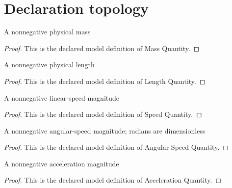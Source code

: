 \section{Declaration topology}
\begin{definition}
  \label{def:physics:phyx-mini-0770:phyxminiproblems-problemphyxmini0770-massquantity}
  A nonnegative physical mass
\end{definition}
\begin{proof}
  This is the declared model definition of Mass Quantity.
\end{proof}
\begin{definition}
  \label{def:physics:phyx-mini-0770:phyxminiproblems-problemphyxmini0770-lengthquantity}
  A nonnegative physical length
\end{definition}
\begin{proof}
  This is the declared model definition of Length Quantity.
\end{proof}
\begin{definition}
  \label{def:physics:phyx-mini-0770:phyxminiproblems-problemphyxmini0770-speedquantity}
  A nonnegative linear-speed magnitude
\end{definition}
\begin{proof}
  This is the declared model definition of Speed Quantity.
\end{proof}
\begin{definition}
  \label{def:physics:phyx-mini-0770:phyxminiproblems-problemphyxmini0770-angularspeedquantity}
  A nonnegative angular-speed magnitude; radians are dimensionless
\end{definition}
\begin{proof}
  This is the declared model definition of Angular Speed Quantity.
\end{proof}
\begin{definition}
  \label{def:physics:phyx-mini-0770:phyxminiproblems-problemphyxmini0770-accelerationquantity}
  A nonnegative acceleration magnitude
\end{definition}
\begin{proof}
  This is the declared model definition of Acceleration Quantity.
\end{proof}
